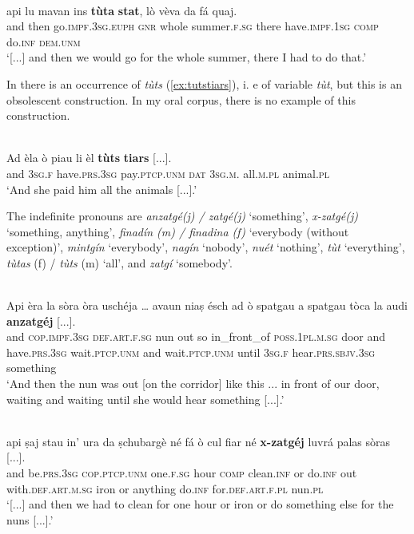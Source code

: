 \ea
{}\\
	\gll [..] api lu mavan ins \textbf{tùta} \textbf{stat}, lò vèva da fá quaj.\\
{} and then go.\textsc{impf.3sg.euph} \textsc{gnr} whole summer.\textsc{f.sg} there have.\textsc{impf.1sg} \textsc{comp} do.\textsc{inf} \textsc{dem.unm}\\
\glt `[...] and then we would go for the whole summer, there I had to do that.'
\z

In \citet[62]{Büchli1966} there is an occurrence of \textit{tùts} (\ref{ex:tutstiars}), i. e of variable \textit{tùt}, but this is an obsolescent construction. In my oral corpus, there is no example of this construction.

\ea
\label{ex:tutstiars}
\\
\gll Ad èla ò piau li èl \textbf{tùts} \textbf{tiars} [...].\\
and \textsc{3sg.f} have.\textsc{prs.3sg} pay.\textsc{ptcp.unm} \textsc{dat} \textsc{3sg.m.} all\textsc{.m.pl} animal.\textsc{pl}\\
\glt `And she paid him all the animals [...].'
\z

The indefinite pronouns are \textit{anzatgé(j) / zatgé(j)} `something', \textit{x-zatgé(j)} `something, anything', \textit{finadín (m) / finadina (f)} `everybody (without exception)', \textit{mintgín} `everybody', \textit{nagín} `nobody', \textit{nuét} `nothing',
 \textit{tùt} `everything', \textit{tùtas} (f) / \textit{tùts} (m) `all', and \textit{zatgí} `somebody'.
 

\ea

\\
\gll    Api èra la sòra òra uschéja … avaun niaṣ ésch ad ò spatgau a spatgau tòca la audi \textbf{anzatgéj} [...].\\
and \textsc{cop.impf.3sg} \textsc{def.art.f.sg} nun out so {} in\_front\_of \textsc{poss.1pl.m.sg} door and have.\textsc{prs.3sg} wait.\textsc{ptcp.unm} and wait.\textsc{ptcp.unm} until \textsc{3sg.f} hear.\textsc{prs.sbjv.3sg} something\\
\glt `And then the nun was out [on the corridor] like this ... in front of our door, waiting and waiting until she would hear something  [...].'
\z

\ea

\\
\gll [...] api ṣaj stau in’ ura da ṣchubargè né fá ò cul fiar né \textbf{x-zatgéj} luvrá palas sòras [...].\\
{} and be.\textsc{prs.3sg} \textsc{cop.ptcp.unm} one.\textsc{f.sg} hour \textsc{comp} clean.\textsc{inf} or do.\textsc{inf} out with.\textsc{def.art.m.sg} iron or anything do.\textsc{inf} for.\textsc{def.art.f.pl} nun.\textsc{pl} \\
\glt `[...] and then we had to clean for one hour or iron or do something else for the nuns [...].'
\z

